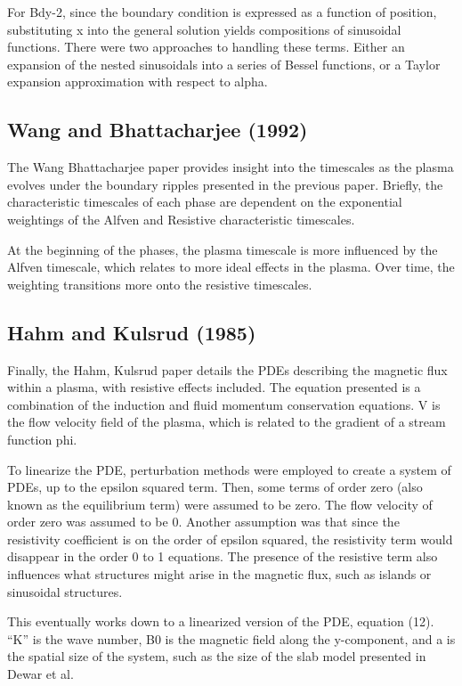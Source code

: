 \documentclass[../main.tex]{subfiles}
\begin{document}
For Bdy-2, since the boundary condition is expressed as a function of position, substituting x into the general solution yields compositions of sinusoidal functions. There were two approaches to handling these terms. Either an expansion of the nested sinusoidals into a series of Bessel functions, or a Taylor expansion approximation with respect to alpha.

\subsection{Wang and Bhattacharjee (1992)}

The Wang Bhattacharjee paper provides insight into the timescales as the plasma evolves under the boundary ripples presented in the previous paper. Briefly, the characteristic timescales of each phase are dependent on the exponential weightings of the Alfven and Resistive characteristic timescales. 

At the beginning of the phases, the plasma timescale is more influenced by the Alfven timescale, which relates to more ideal effects in the plasma. Over time, the weighting transitions more onto the resistive timescales.

\subsection{Hahm and Kulsrud (1985)}

Finally, the Hahm, Kulsrud paper details the PDEs describing the magnetic flux within a plasma, with resistive effects included. The equation presented is a combination of the induction and fluid momentum conservation equations. V is the flow velocity field of the plasma, which is related to the gradient of a stream function phi.

To linearize the PDE, perturbation methods were employed to create a system of PDEs, up to the epsilon squared term. Then, some terms of order zero (also known as the equilibrium term) were assumed to be zero. The flow velocity of order zero was assumed to be 0. Another assumption was that since the resistivity coefficient is on the order of epsilon squared, the resistivity term would disappear in the order 0 to 1 equations. The presence of the resistive term also influences what structures might arise in the magnetic flux, such as islands or sinusoidal structures.

This eventually works down to a linearized version of the PDE, equation (12). “K” is the wave number, B0 is the magnetic field along the y-component, and a is the spatial size of the system, such as the size of the slab model presented in Dewar et al.

    
\end{document}
